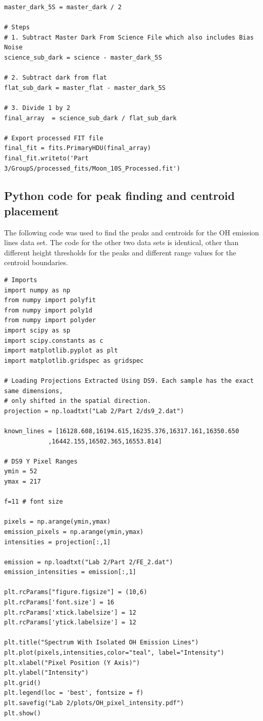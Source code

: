 \documentclass{article}
\begin{document}
\begin{appendices}
\begin{footnotesize}
\begin{verbatim}
master_dark_5S = master_dark / 2

# Steps
# 1. Subtract Master Dark From Science File which also includes Bias Noise 
science_sub_dark = science - master_dark_5S

# 2. Subtract dark from flat 
flat_sub_dark = master_flat - master_dark_5S

# 3. Divide 1 by 2
final_array  = science_sub_dark / flat_sub_dark

# Export processed FIT file 
final_fit = fits.PrimaryHDU(final_array)
final_fit.writeto('Part 3/GroupS/processed_fits/Moon_10S_Processed.fit')
\end{verbatim}
\end{footnotesize}
\subsection{Python code for peak finding and centroid placement}
\label{code:centroids}
The following code was used to find the peaks and centroids for the OH emission lines data set. The code for the 
other two data sets is identical, other than different height thresholds for the peaks and different range 
values for the centroid boundaries. 
\begin{footnotesize}
\begin{verbatim}
# Imports 
import numpy as np
from numpy import polyfit
from numpy import poly1d
from numpy import polyder
import scipy as sp
import scipy.constants as c
import matplotlib.pyplot as plt
import matplotlib.gridspec as gridspec

# Loading Projections Extracted Using DS9. Each sample has the exact same dimensions, 
# only shifted in the spatial direction.
projection = np.loadtxt("Lab 2/Part 2/ds9_2.dat")

known_lines = [16128.608,16194.615,16235.376,16317.161,16350.650
            ,16442.155,16502.365,16553.814]

# DS9 Y Pixel Ranges
ymin = 52
ymax = 217

f=11 # font size

pixels = np.arange(ymin,ymax)
emission_pixels = np.arange(ymin,ymax)
intensities = projection[:,1]

emission = np.loadtxt("Lab 2/Part 2/FE_2.dat")
emission_intensities = emission[:,1]

plt.rcParams["figure.figsize"] = (10,6)
plt.rcParams['font.size'] = 16
plt.rcParams['xtick.labelsize'] = 12
plt.rcParams['ytick.labelsize'] = 12

plt.title("Spectrum With Isolated OH Emission Lines")
plt.plot(pixels,intensities,color="teal", label="Intensity")
plt.xlabel("Pixel Position (Y Axis)")
plt.ylabel("Intensity")
plt.grid()
plt.legend(loc = 'best', fontsize = f)
plt.savefig("Lab 2/plots/OH_pixel_intensity.pdf")
plt.show()


\end{verbatim}
\end{footnotesize}
\end{appendices}
\end{document}

